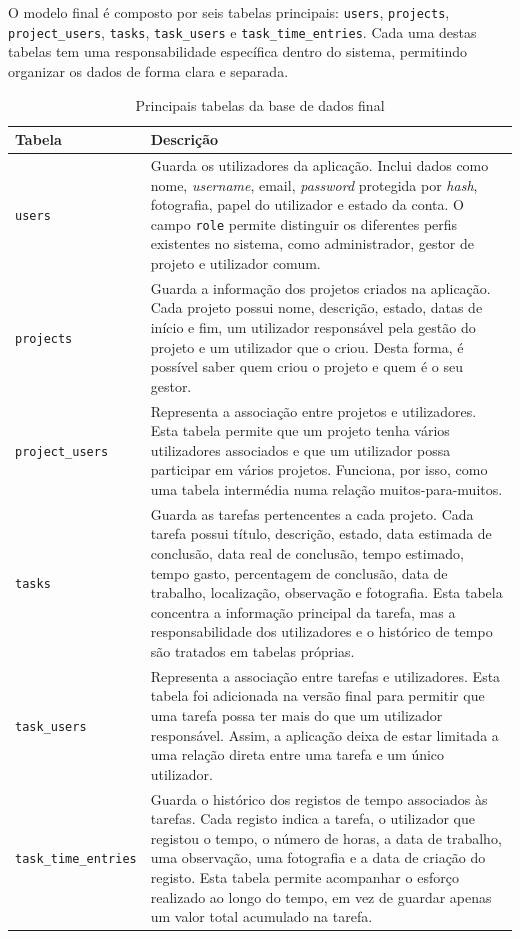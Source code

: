 \documentclass[12pt,a4paper]{article}
\begin{document}
O modelo final é composto por seis tabelas principais: \texttt{users}, \texttt{projects}, \texttt{project\_users}, \texttt{tasks}, \texttt{task\_users} e \texttt{task\_time\_entries}. Cada uma destas tabelas tem uma responsabilidade específica dentro do sistema, permitindo organizar os dados de forma clara e separada.

\begin{table}[H]
\centering
\caption{Principais tabelas da base de dados final}
\begin{tabular}{|p{3.4cm}|p{10.1cm}|}
\hline
\textbf{Tabela} & \textbf{Descrição}\\
\hline
\texttt{users} & Guarda os utilizadores da aplicação. Inclui dados como nome, \textit{username}, email, \textit{password} protegida por \textit{hash}, fotografia, papel do utilizador e estado da conta. O campo \texttt{role} permite distinguir os diferentes perfis existentes no sistema, como administrador, gestor de projeto e utilizador comum.\\
\hline
\texttt{projects} & Guarda a informação dos projetos criados na aplicação. Cada projeto possui nome, descrição, estado, datas de início e fim, um utilizador responsável pela gestão do projeto e um utilizador que o criou. Desta forma, é possível saber quem criou o projeto e quem é o seu gestor.\\
\hline
\texttt{project\_users} & Representa a associação entre projetos e utilizadores. Esta tabela permite que um projeto tenha vários utilizadores associados e que um utilizador possa participar em vários projetos. Funciona, por isso, como uma tabela intermédia numa relação muitos-para-muitos.\\
\hline
\texttt{tasks} & Guarda as tarefas pertencentes a cada projeto. Cada tarefa possui título, descrição, estado, data estimada de conclusão, data real de conclusão, tempo estimado, tempo gasto, percentagem de conclusão, data de trabalho, localização, observação e fotografia. Esta tabela concentra a informação principal da tarefa, mas a responsabilidade dos utilizadores e o histórico de tempo são tratados em tabelas próprias.\\
\hline
\texttt{task\_users} & Representa a associação entre tarefas e utilizadores. Esta tabela foi adicionada na versão final para permitir que uma tarefa possa ter mais do que um utilizador responsável. Assim, a aplicação deixa de estar limitada a uma relação direta entre uma tarefa e um único utilizador.\\
\hline
\texttt{task\_time\_entries} & Guarda o histórico dos registos de tempo associados às tarefas. Cada registo indica a tarefa, o utilizador que registou o tempo, o número de horas, a data de trabalho, uma observação, uma fotografia e a data de criação do registo. Esta tabela permite acompanhar o esforço realizado ao longo do tempo, em vez de guardar apenas um valor total acumulado na tarefa.\\
\hline
\end{tabular}
\end{table}
\end{document}
